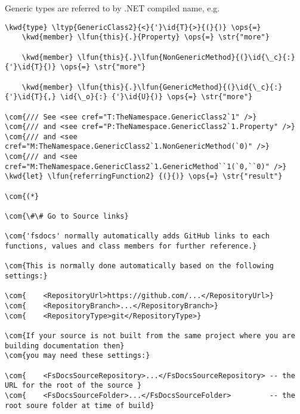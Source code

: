 \documentclass{article}
\newcommand{\id}[1]{\textcolor{black}{#1}}
\newcommand{\com}[1]{\textcolor{officegreen}{#1}}
\newcommand{\kwd}[1]{\textcolor{navy}{#1}}
\newcommand{\ops}[1]{\textcolor{purple}{#1}}
\newcommand{\str}[1]{\textcolor{olive}{#1}}
\begin{document}
Generic types are referred to by .NET compiled name, e.g.
\begin{Verbatim}[commandchars=\\\{\}]
\kwd{type} \ltyp{GenericClass2}{<}{'}\id{T}{>}{(}{)} \ops{=} 
    \kwd{member} \lfun{this}{.}{Property} \ops{=} \str{"more"}

    \kwd{member} \lfun{this}{.}\lfun{NonGenericMethod}{(}\id{\_c}{:} {'}\id{T}{)} \ops{=} \str{"more"}

    \kwd{member} \lfun{this}{.}\lfun{GenericMethod}{(}\id{\_c}{:} {'}\id{T}{,} \id{\_o}{:} {'}\id{U}{)} \ops{=} \str{"more"}

\com{/// See <see cref="T:TheNamespace.GenericClass2`1" />}
\com{/// and <see cref="P:TheNamespace.GenericClass2`1.Property" />}
\com{/// and <see cref="M:TheNamespace.GenericClass2`1.NonGenericMethod(`0)" />}
\com{/// and <see cref="M:TheNamespace.GenericClass2`1.GenericMethod``1(`0,``0)" />}
\kwd{let} \lfun{referringFunction2} {(}{)} \ops{=} \str{"result"}

\com{(*}

\com{\#\# Go to Source links}

\com{'fsdocs' normally automatically adds GitHub links to each functions, values and class members for further reference.}

\com{This is normally done automatically based on the following settings:}

\com{    <RepositoryUrl>https://github.com/...</RepositoryUrl>}
\com{    <RepositoryBranch>...</RepositoryBranch>}
\com{    <RepositoryType>git</RepositoryType>}

\com{If your source is not built from the same project where you are building documentation then}
\com{you may need these settings:}

\com{    <FsDocsSourceRepository>...</FsDocsSourceRepository> -- the URL for the root of the source }
\com{    <FsDocsSourceFolder>...</FsDocsSourceFolder>         -- the root soure folder at time of build}

\com{It is assumed that `sourceRepo` and `sourceFolder` have synchronized contents.}

\com{\#\# Markdown Comments}

\com{You can use Markdown instead of XML in `///` comments. If you do, you should set `<UsesMarkdownComments>` in}
\com{your F\# project file.}

\com{> Note: Markdown Comments are not supported in all F\# IDE tooling.}

\com{\#\#\# Adding cross-type links to modules and types in the same assembly}


\end{Verbatim}
\end{document}
